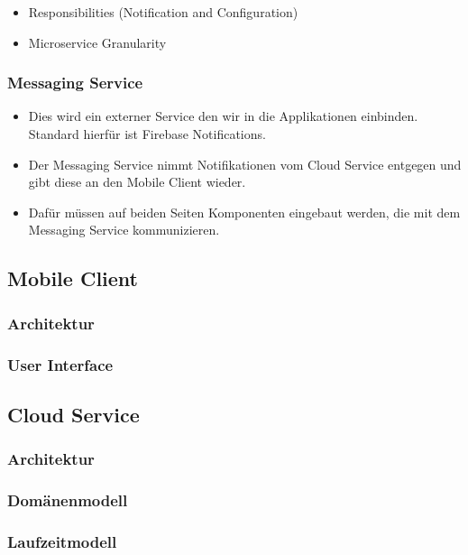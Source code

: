         \begin{itemize}
            \item Responsibilities (Notification and Configuration)
            \item Microservice Granularity
        \end{itemize}


    \subsubsection*{Messaging Service}

        \begin{itemize}
            \item Dies wird ein externer Service den wir in die Applikationen einbinden. Standard hierfür ist Firebase Notifications. 
            \item Der Messaging Service nimmt Notifikationen vom Cloud Service entgegen und gibt diese an den Mobile Client wieder. 
            \item Dafür müssen auf beiden Seiten Komponenten eingebaut werden, die mit dem Messaging Service kommunizieren.
        \end{itemize}


\subsection{Mobile Client}
    \subsubsection{Architektur}
    \subsubsection{User Interface}

\subsection{Cloud Service}
    \subsubsection{Architektur}
    \subsubsection{Domänenmodell}
    \subsubsection{Laufzeitmodell}

